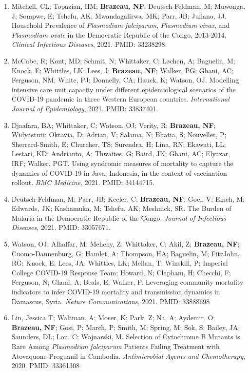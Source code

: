 \documentclass[11pt,letterpaper]{article}
\begin{document}
\begin{enumerate}[leftmargin=*, itemsep=4pt, parsep=0pt]
\item Mitchell, CL; Topazian, HM; \textbf{Brazeau, NF}; Deutsch-Feldman, M; Muwonga, J; Sompwe, E; Tshefu, AK; Mwandagalirwa, MK; Parr, JB; Juliano, JJ. Household Prevalence of \textit{Plasmodium falciparum}, \textit{Plasmodium vivax}, and \textit{Plasmodium ovale} in the Democratic Republic of the Congo, 2013-2014. \textit{Clinical Infectious Diseases}, 2021. PMID: 33238298.

\item McCabe, R; Kont, MD; Schmit, N; Whittaker, C; Løchen, A; Baguelin, M; Knock, E; Whittles, LK; Lees, J; \textbf{Brazeau, NF}; Walker, PG; Ghani, AC; Ferguson, NM; White, PJ; Donnelly, CA; Hauck, K; Watson, OJ. Modelling intensive care unit capacity under different epidemiological scenarios of the COVID-19 pandemic in three Western European countries. \textit{International Journal of Epidemiology}, 2021. PMID: 33837401.

\item Djaafara, BA; Whittaker, C; Watson, OJ; Verity, R; \textbf{Brazeau, NF}; Widyastuti; Oktavia, D; Adrian, V; Salama, N; Bhatia, S; Nouvellet, P; Sherrard-Smith, E; Churcher, TS; Surendra, H; Lina, RN; Ekawati, LL; Lestari, KD; Andrianto, A; Thwaites, G; Baird, JK; Ghani, AC; Elyazar, IRF; Walker, PGT. Using syndromic measures of mortality to capture the dynamics of COVID-19 in Java, Indonesia, in the context of vaccination rollout. \textit{BMC Medicine}, 2021. PMID: 34144715.

\item Deutsch-Feldman, M; Parr, JB; Keeler, C; \textbf{Brazeau, NF}; Goel, V; Emch, M; Edwards, JK; Kashamuka, M; Tshefu, AK; Meshnick, SR. The Burden of Malaria in the Democratic Republic of the Congo. \textit{Journal of Infectious Diseases}, 2021. PMID: 33057671.

\item Watson, OJ; Alhaffar, M; Mehchy, Z; Whittaker, C; Akil, Z; \textbf{Brazeau, NF}; Cuomo-Dannenburg, G; Hamlet, A; Thompson, HA; Baguelin, M; FitzJohn, RG; Knock, E; Lees, JA; Whittles, LK; Mellan, T; Winskill, P; Imperial College COVID-19 Response Team; Howard, N; Clapham, H; Checchi, F; Ferguson, N; Ghani, A; Beals, E; Walker, P. Leveraging community mortality indicators to infer COVID-19 mortality and transmission dynamics in Damascus, Syria. \textit{Nature Communications}, 2021. PMID: 33888698

\item Lin, Jessica T; Waltman, A; Moser, K; Park, Z; Na, A; Aydemir, O; \textbf{Brazeau, NF}; Gosi, P; March, P; Smith, M; Spring, M; Sok, S; Bailey, JA; Saunders, DL; Lon, C; Wojnarski, M. Selection of Cytochrome B Mutants is Rare Among \textit{Plasmodium falciparum} Patients Failing Treatment with Atovaquone-Proguanil in Cambodia. \textit{Antimicrobial Agents and Chemotherapy}, 2020. PMID: 33361308


\end{enumerate}
\end{document}
